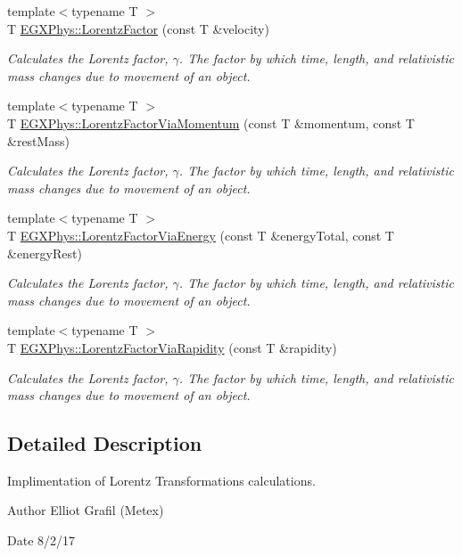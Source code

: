 \begin{DoxyCompactItemize}
\item 
{\footnotesize template$<$typename T $>$ }\\T \hyperlink{group___e_g_x_phys-_lorentz_factor_ga5f9b11c1f4c3ae26a7e64f02c22d5a75}{E\+G\+X\+Phys\+::\+Lorentz\+Factor} (const T \&velocity)
\begin{DoxyCompactList}\small\item\em Calculates the Lorentz factor, $\gamma$. The factor by which time, length, and relativistic mass changes due to movement of an object. \end{DoxyCompactList}\item 
{\footnotesize template$<$typename T $>$ }\\T \hyperlink{group___e_g_x_phys-_lorentz_factor_ga1ea24128654ac333dd843afdd5c003b7}{E\+G\+X\+Phys\+::\+Lorentz\+Factor\+Via\+Momentum} (const T \&momentum, const T \&rest\+Mass)
\begin{DoxyCompactList}\small\item\em Calculates the Lorentz factor, $\gamma$. The factor by which time, length, and relativistic mass changes due to movement of an object. \end{DoxyCompactList}\item 
{\footnotesize template$<$typename T $>$ }\\T \hyperlink{group___e_g_x_phys-_lorentz_factor_ga601de8c039be89a9abea22bc459436c9}{E\+G\+X\+Phys\+::\+Lorentz\+Factor\+Via\+Energy} (const T \&energy\+Total, const T \&energy\+Rest)
\begin{DoxyCompactList}\small\item\em Calculates the Lorentz factor, $\gamma$. The factor by which time, length, and relativistic mass changes due to movement of an object. \end{DoxyCompactList}\item 
{\footnotesize template$<$typename T $>$ }\\T \hyperlink{group___e_g_x_phys-_lorentz_factor_ga8064f5bce1d2ca5f7bc39d95ba4d2dd9}{E\+G\+X\+Phys\+::\+Lorentz\+Factor\+Via\+Rapidity} (const T \&rapidity)
\begin{DoxyCompactList}\small\item\em Calculates the Lorentz factor, $\gamma$. The factor by which time, length, and relativistic mass changes due to movement of an object. \end{DoxyCompactList}\end{DoxyCompactItemize}


\subsection{Detailed Description}
Implimentation of Lorentz Transformations calculations. 

\begin{DoxyAuthor}{Author}
Elliot Grafil (Metex) 
\end{DoxyAuthor}
\begin{DoxyDate}{Date}
8/2/17 
\end{DoxyDate}
